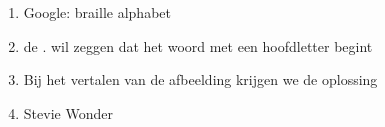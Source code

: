\begin{enumerate}
  \item Google: braille alphabet
  \item de . wil zeggen dat het woord met een hoofdletter begint
  \item Bij het vertalen van de afbeelding krijgen we de oplossing
  \item Stevie Wonder
\end{enumerate}